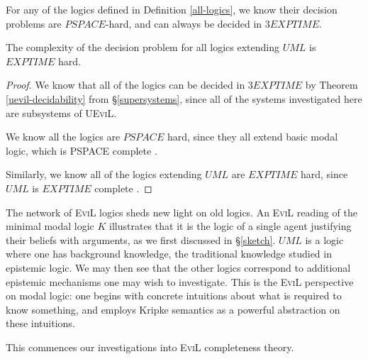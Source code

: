\begin{lemma}
For any of the logics defined in Definition
\ref{all-logics}, we know their decision problems are $PSPACE$-hard, and can always be
decided in  $3EXPTIME$.

The complexity of the decision problem for all logics extending $UML$
is $EXPTIME$ hard.
\end{lemma}
\begin{proof}
We know that all of the logics can be decided in $3EXPTIME$ by Theorem
\ref{uevil-decidability} from \S\ref{supersystems}, since all of the
systems investigated here are subsystems of U\textsc{EviL}. 

We know all the logics are $PSPACE$ hard, since they all extend basic
modal logic, which is \textsf{PSPACE} complete \cite[chapter
6.3]{van_benthem_modal_2010}.

Similarly, we know all of the logics extending $UML$ are $EXPTIME$
hard, since $UML$ is $EXPTIME$ complete \cite[chapter
7.4]{van_benthem_modal_2010}.
\end{proof}

The network of \textsc{EviL} logics sheds new light on old logics.  An
\textsc{EviL} reading of the minimal modal logic $K$ illustrates that
it is the logic of a single agent justifying their beliefs with
arguments, as we first discussed in \S\ref{sketch}.  $UML$ is a logic where one has background knowledge, the
traditional knowledge studied in epistemic logic.  We may then see
that the other logics correspond to additional epistemic mechanisms 
one may wish to investigate.  This is the \textsc{EviL} perspective on
modal logic:  one begins with concrete intuitions about what is
required to know something, and employs Kripke semantics as a powerful
abstraction on these intuitions.  

This commences our investigations into \textsc{EviL} completeness
theory.

